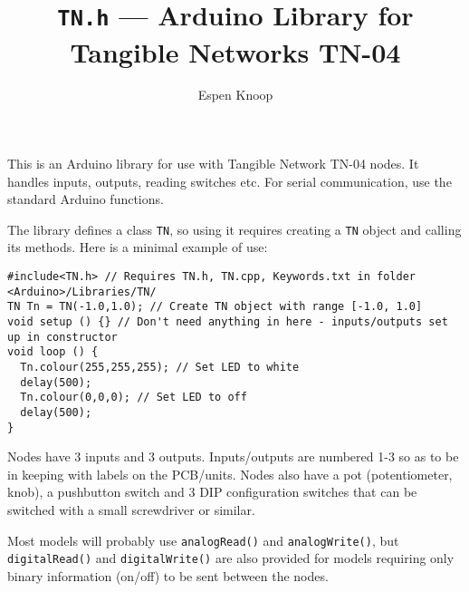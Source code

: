 \documentclass[a4paper,10pt]{article}
\title{\texttt{TN.h} --- Arduino Library for Tangible Networks TN-04}
\author{Espen Knoop}
\date{}
\begin{document}
\maketitle

This is an Arduino library for use with Tangible Network TN-04 nodes.  It handles inputs, outputs, reading switches etc.  For serial communication, use the standard Arduino functions.  

The library defines a class \verb|TN|, so using it requires creating a \verb|TN| object and calling its methods.  Here is a minimal example of use:
\begin{verbatim}
#include<TN.h> // Requires TN.h, TN.cpp, Keywords.txt in folder <Arduino>/Libraries/TN/
TN Tn = TN(-1.0,1.0); // Create TN object with range [-1.0, 1.0]
void setup () {} // Don't need anything in here - inputs/outputs set up in constructor
void loop () {
  Tn.colour(255,255,255); // Set LED to white
  delay(500);
  Tn.colour(0,0,0); // Set LED to off
  delay(500);
}
\end{verbatim}

Nodes have 3 inputs and 3 outputs.  Inputs/outputs are numbered 1-3 so as to be in keeping with labels on the PCB/units.  Nodes also have a pot (potentiometer, knob), a pushbutton switch and 3 DIP configuration switches that can be switched with a small screwdriver or similar.

Most models will probably use \verb|analogRead()| and \verb|analogWrite()|, but \verb|digitalRead()| and \verb|digitalWrite()| are also provided for models requiring only binary information (on/off) to be sent between the nodes.
\end{document}
